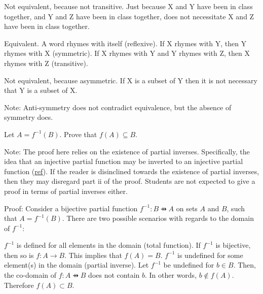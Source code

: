 \documentclass[addpoints]{exam}
\begin{document}
\begin{questions}
\begin{parts}
  \begin{solution}
  \begin{subparts}
    \subpart Not equivalent, because not transitive. Just because X and Y have been in class together, and Y and Z have been in class together, does not necessitate X and Z have been in class together.

    \subpart Equivalent. A word rhymes with itself (reflexive). If X rhymes with Y, then Y rhymes with X (symmetric). If X rhymes with Y and Y rhymes with Z, then X rhymes with Z (transitive).

    \subpart Not equivalent, because asymmetric. If X is a subset of Y then it is not necessary that Y is a subset of X.
    

  \end{subparts}
      Note: Anti-symmetry does not contradict equivalence, but the absence of symmetry does.
  \end{solution}

\end{parts}

\question[15] Let $A = f^{-1}(B)$. Prove that $f(A) \subseteq B$.
  \begin{solution}
      
    Note: The proof here relies on the existence of partial inverses. Specifically, the idea that an injective partial function may be inverted to an injective partial function (\href{https://en.wikipedia.org/wiki/Partial_function#Basic_concepts}{ref}). If the reader is disinclined towards the existence of partial inverses, then they may disregard part ii of the proof. Students are not expected to give a proof in terms of partial inverses either.
  
   Proof: Consider a bijective partial function $f^{-1}: B \pfun A$ on sets $A$ and $B$, such that $A = f^{-1}(B)$. There are two possible scenarios with regards to the domain of $f^{-1}$:
   \begin{subparts}
   \subpart $f^{-1}$  is defined for all elements in the domain (total function). If $f^{-1}$ is bijective, then so is $f : A \rightarrow B$. This implies that $f(A) = B$. 
   \subpart $f^{-1}$  is undefined for some element(s) in the domain (partial inverse). Let $f^{-1}$ be undefined for $b \in B$. Then, the co-domain of $f: A \pfun B$ does not contain $b$. In other words, $b \not\in f(A)$. Therefore $f(A) \subset B$.
   


    \end{subparts}


\end{solution}
\end{questions}
\end{document}
